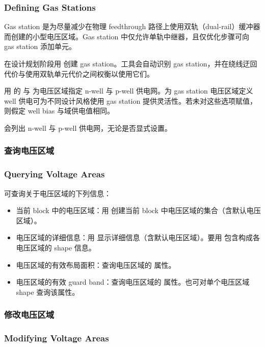 \subsubsection*{Defining Gas Stations}

Gas station 是为尽量减少在物理 feedthrough 路径上使用双轨（dual-rail）缓冲器而创建的小型电压区域。Gas station 中仅允许单轨中继器，且仅优化步骤可向 gas station 添加单元。

在设计规划阶段用  创建 gas station。工具会自动识别 gas station，并在绕线迂回代价与使用双轨单元代价之间权衡以使用它们。

用  的  与  为电压区域指定 n-well 与 p-well 供电网。为 gas station 电压区域定义 well 供电可为不同设计风格使用 gas station 提供灵活性。若未对这些选项赋值，则假定 well bias 与域供电值相同。

 会列出 n-well 与 p-well 供电网，无论是否显式设置。

\subsubsection{查询电压区域}
\subsubsection*{Querying Voltage Areas}

可查询关于电压区域的下列信息：
\begin{itemize}
  \item 当前 block 中的电压区域：用  创建当前 block 中电压区域的集合（含默认电压区域）。
  \item 电压区域的详细信息：用  显示详细信息（含默认电压区域）。要用  包含构成各电压区域的 shape 信息。
  \item 电压区域的有效布局面积：查询电压区域的  属性。
  \item 电压区域的有效 guard band：查询电压区域的  属性。也可对单个电压区域 shape 查询该属性。
\end{itemize}

\subsubsection{修改电压区域}
\subsubsection*{Modifying Voltage Areas}

